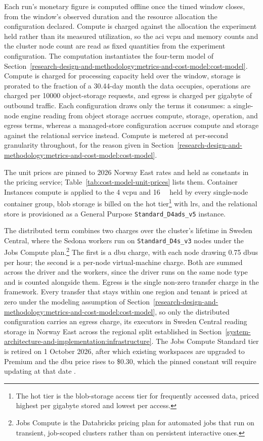Each run's monetary figure is computed offline once the timed window closes, from the window's observed duration and the resource allocation the configuration declared. Compute is charged against the allocation the experiment held rather than its measured utilization, so the \acrshort{aci} \acrshort{vcpu} and memory counts and the cluster node count are read as fixed quantities from the experiment configuration. The computation instantiates the four-term model of Section~\ref{research-design-and-methodology:metrics-and-cost-model:cost-model}. Compute is charged for processing capacity held over the window, storage is prorated to the fraction of a \num{30.44}-day month the data occupies, operations are charged per \num{10000} object-storage requests, and egress is charged per gigabyte of outbound traffic. Each configuration draws only the terms it consumes: a single-node engine reading from object storage accrues compute, storage, operation, and egress terms, whereas a managed-store configuration accrues compute and storage against the relational service instead. Compute is metered at per-second granularity throughout, for the reason given in Section~\ref{research-design-and-methodology:metrics-and-cost-model:cost-model}.

The unit prices are pinned to 2026 Norway East rates and held as constants in the pricing service; Table~\ref{tab:cost-model-unit-prices} lists them. Container Instances compute is applied to the \num{4} \acrshort{vcpu} and \SI{16}{\gibi\byte} held by every single-node container group, blob storage is billed on the hot tier\footnote{The hot tier is the blob-storage access tier for frequently accessed data, priced highest per gigabyte stored and lowest per access.} with \acrfull{lrs}, and the relational store is provisioned as a General Purpose \texttt{Standard\_D4ads\_v5} instance.

The distributed term combines two charges over the cluster's lifetime in Sweden Central, where the Sedona workers run on \texttt{Standard\_D4s\_v3} nodes under the Jobs Compute plan.\footnote{Jobs Compute is the Databricks pricing plan for automated jobs that run on transient, job-scoped clusters rather than on persistent interactive ones.} The first is a \acrfull{dbu} charge, with each node drawing \num{0.75} \acrshort{dbu}s per hour; the second is a per-node virtual-machine charge. Both are summed across the driver and the workers, since the driver runs on the same node type and is counted alongside them. Egress is the single non-zero transfer charge in the framework. Every transfer that stays within one region and tenant is priced at zero under the modeling assumption of Section~\ref{research-design-and-methodology:metrics-and-cost-model:cost-model}, so only the distributed configuration carries an egress charge, its executors in Sweden Central reading storage in Norway East across the regional split established in Section~\ref{system-architecture-and-implementation:infrastructure}. The Jobs Compute Standard tier is retired on 1 October 2026, after which existing workspaces are upgraded to Premium and the \acrshort{dbu} price rises to \$\num{0.30}, which the pinned constant will require updating at that date \parencite{databricks2024_pricing}.

